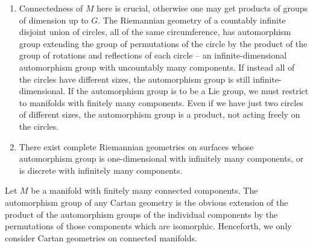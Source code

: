 \begin{example}
    \begin{enumerate}
        \item Connectedness of $M$ here is crucial, otherwise one may get products of groups of dimension up to $G$. The Riemannian geometry of a countably infinite disjoint union of circles, all of the same circumference, has automorphism group extending the group of permutations of the circle by the product of the group of rotations and reflections of each circle -- an infinite-dimensional automorphism group with uncountably many components. If instead all of the circles have different sizes, the automorphism group is still infinite-dimensional. If the automorphism group is to be a Lie group, we must restrict to manifolds with finitely many components. Even if we have just two circles of different sizes, the automorphism group is a product, not acting freely on the circles.
        \item There exist complete Riemannian geometries on surfaces whose automorphism group is one-dimensional with infinitely many components, or is discrete with infinitely many components.
    \end{enumerate}
\end{example}

\begin{example}
    Let $M$ be a manifold with finitely many connected components. The automorphism group of any Cartan geometry is the obvious extension of the product of the automorphism groups of the individual components by the permutations of those components which are isomorphic. Henceforth, we only consider Cartan geometries on connected manifolds.
\end{example}

